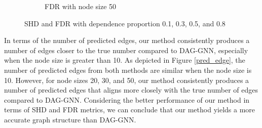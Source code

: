 \documentclass[10pt]{article}
\begin{document}
\begin{figure}[p]
\begin{subfigure}{0.45\textwidth}
        \caption{FDR with node size 50}
        \label{FDR_node50}
    \end{subfigure}
    \caption{SHD and FDR with dependence proportion 0.1, 0.3, 0.5, and 0.8}
    \label{SHD_FDR}
\end{figure}

In terms of the number of predicted edges, our method consistently produces a number of edges closer to the true number compared to DAG-GNN, especially when the node size is greater than 10. As depicted in Figure \ref*{pred_edge}, the number of predicted edges from both methods are similar when the node size is 10. However, for node sizes 20, 30, and 50, our method consistently produces a number of predicted edges that aligns more closely with the true number of edges compared to DAG-GNN. Considering the better performance of our method in terms of SHD and FDR metrics, we can conclude that our method yields a more accurate graph structure than DAG-GNN.
\end{document}
